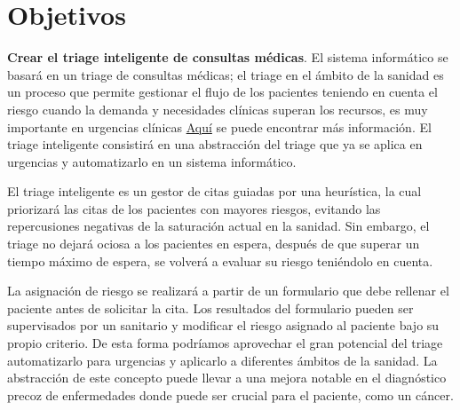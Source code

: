 \section{Objetivos}

\textbf{Crear el triage inteligente de consultas médicas}. El sistema informático se basará en un triage de consultas médicas; el triage en el ámbito
 de la sanidad es un proceso que permite gestionar el flujo de los pacientes teniendo en cuenta el riesgo cuando la demanda y necesidades clínicas
 superan los recursos, es muy importante en urgencias clínicas \href{https://scielo.isciii.es/scielo.php?script=sci_arttext&pid=S1137-66272010000200008}{Aquí}
 se puede encontrar más información. El triage inteligente consistirá en una abstracción del triage que ya se aplica en urgencias y automatizarlo en un sistema informático.

El triage inteligente es un gestor de citas guiadas por una heurística, la cual priorizará las citas de los pacientes
con mayores riesgos, evitando las repercusiones negativas de la saturación actual en la sanidad. Sin embargo, el triage no dejará
ociosa a los pacientes en espera, después de que superar un tiempo máximo de espera, se volverá a evaluar su riesgo teniéndolo en cuenta.

La asignación de riesgo se realizará a partir de un formulario que debe rellenar el paciente antes de solicitar la cita.
Los resultados del formulario pueden ser supervisados por un sanitario y modificar el riesgo asignado al paciente bajo su propio criterio.
De esta forma podríamos aprovechar el gran potencial del triage automatizarlo para urgencias y aplicarlo a diferentes ámbitos de la sanidad.
La abstracción de este concepto puede llevar a una mejora notable en el diagnóstico precoz de enfermedades donde puede ser crucial para el paciente, como un cáncer.

